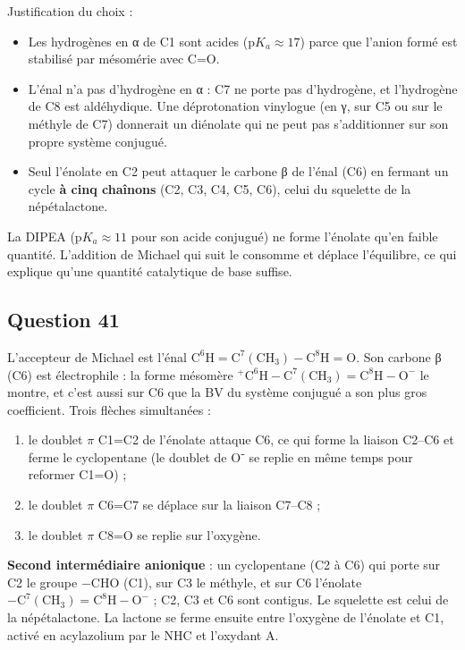 \documentclass[11pt,a4paper]{article}
\providecommand{\tightlist}{\setlength{\itemsep}{0pt}\setlength{\parskip}{0pt}}
\begin{document}
Justification du choix :

\begin{itemize}
\tightlist
\item
  Les hydrogènes en α de C1 sont acides (\(\mathrm pK_a\approx17\)) parce que l'anion formé est stabilisé par mésomérie avec C=O.
\item
  L'énal n'a pas d'hydrogène en α : C7 ne porte pas d'hydrogène, et l'hydrogène de C8 est aldéhydique. Une déprotonation vinylogue (en γ, sur C5 ou sur le méthyle de C7) donnerait un diénolate qui ne peut pas s'additionner sur son propre système conjugué.
\item
  Seul l'énolate en C2 peut attaquer le carbone β de l'énal (C6) en fermant un cycle \textbf{à cinq chaînons} (C2, C3, C4, C5, C6), celui du squelette de la népétalactone.
\end{itemize}

La DIPEA (\(\mathrm pK_a\approx11\) pour son acide conjugué) ne forme l'énolate qu'en faible quantité. L'addition de Michael qui suit le consomme et déplace l'équilibre, ce qui explique qu'une quantité catalytique de base suffise.

\hypertarget{question-41}{%
\subsection{Question 41}\label{question-41}}

L'accepteur de Michael est l'énal \(\mathrm{C^6H{=}C^7(CH_3){-}C^8H{=}O}\). Son carbone β (C6) est électrophile : la forme mésomère \(\mathrm{^+C^6H{-}C^7(CH_3){=}C^8H{-}O^-}\) le montre, et c'est aussi sur C6 que la BV du système conjugué a son plus gros coefficient. Trois flèches simultanées :

\begin{enumerate}
\def\labelenumi{\arabic{enumi}.}
\tightlist
\item
  le doublet \(\pi\) C1=C2 de l'énolate attaque C6, ce qui forme la liaison C2--C6 et ferme le cyclopentane (le doublet de O⁻ se replie en même temps pour reformer C1=O) ;
\item
  le doublet \(\pi\) C6=C7 se déplace sur la liaison C7--C8 ;
\item
  le doublet \(\pi\) C8=O se replie sur l'oxygène.
\end{enumerate}

\textbf{Second intermédiaire anionique} : un cyclopentane (C2 à C6) qui porte sur C2 le groupe \(\mathrm{-CHO}\) (C1), sur C3 le méthyle, et sur C6 l'énolate \(\mathrm{-C^7(CH_3){=}C^8H{-}O^-}\) ; C2, C3 et C6 sont contigus. Le squelette est celui de la népétalactone. La lactone se ferme ensuite entre l'oxygène de l'énolate et C1, activé en acylazolium par le NHC et l'oxydant A.
\end{document}

